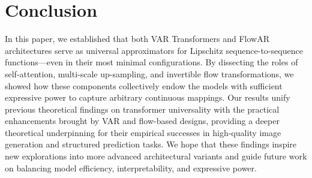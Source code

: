 \section{Conclusion}\label{sec:conclusion}

In this paper, we established that both VAR Transformers and FlowAR architectures serve as universal approximators for Lipschitz sequence-to-sequence functions—even in their most minimal configurations. By dissecting the roles of self-attention, multi-scale up-sampling, and invertible flow transformations, we showed how these components collectively endow the models with sufficient expressive power to capture arbitrary continuous mappings. Our results unify previous theoretical findings on transformer universality with the practical enhancements brought by VAR and flow-based designs, providing a deeper theoretical underpinning for their empirical successes in high-quality image generation and structured prediction tasks. We hope that these findings inspire new explorations into more advanced architectural variants and guide future work on balancing model efficiency, interpretability, and expressive power.
